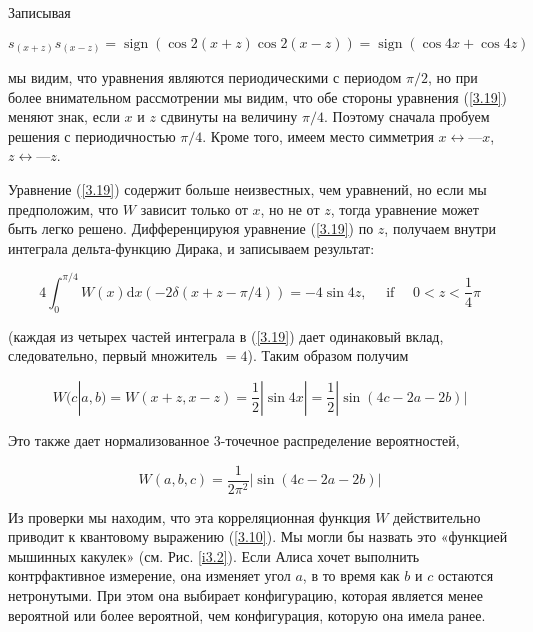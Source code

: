 \documentclass[main.tex]{subfiles}
\begin{document}
Записывая

\begin{equation}\label{3.20}
	s_{(x+z)} s_{(x-z)}=\operatorname{sign}(\cos 2(x+z) \cos 2(x-z))=\operatorname{sign}(\cos 4 x+\cos 4 z)
\end{equation}

мы видим, что уравнения являются периодическими с периодом $\pi / 2$, но при более внимательном рассмотрении мы видим, что обе стороны уравнения (\ref{3.19}) меняют знак, если $x$ и $z$ сдвинуты на величину $\pi / 4$. Поэтому сначала пробуем решения с периодичностью $\pi / 4$. Кроме того, имеем место симметрия $x \leftrightarrow — x$, $z \leftrightarrow — z$.

Уравнение (\ref{3.19}) содержит больше неизвестных, чем уравнений, но если мы предположим, что $W$ зависит только от $x$, но не от $z$, тогда уравнение может быть легко решено. Дифференцируюя уравнение (\ref{3.19}) по $z$, получаем внутри интеграла  дельта-функцию Дирака, и записываем результат:

\begin{equation}\label{3.21}
	4 \int_{0}^{\pi / 4} W(x) \mathrm{d} x(-2 \delta(x+z-\pi / 4))=-4 \sin 4 z, \quad \text { if } \quad 0<z<\frac{1}{4} \pi
\end{equation}

(каждая из четырех частей интеграла в (\ref{3.19}) дает одинаковый вклад, следовательно, первый множитель $= 4$). Таким образом получим

\begin{equation}\label{3.22}
	W(c | a, b)=W(x+z, x-z)=\frac{1}{2}|\sin 4 x|=\frac{1}{2}|\sin (4 c-2 a-2 b)|
\end{equation}

Это также дает нормализованное 3-точечное распределение вероятностей,

\begin{equation}\label{3.23}
	W(a, b, c)=\frac{1}{2 \pi^{2}}|\sin (4 c-2 a-2 b)|
\end{equation}

Из проверки мы находим, что эта корреляционная функция $W$ действительно приводит к квантовому выражению (\ref{3.10}). Мы могли бы назвать это «функцией мышинных какулек» (см. Рис. \ref{i3.2}). Если Алиса хочет выполнить контрфактивное измерение, она изменяет угол $a$, в то время как $b$ и $c$ остаются нетронутыми. При этом она выбирает конфигурацию, которая является менее вероятной или более вероятной, чем конфигурация, которую она имела ранее.
\end{document}
